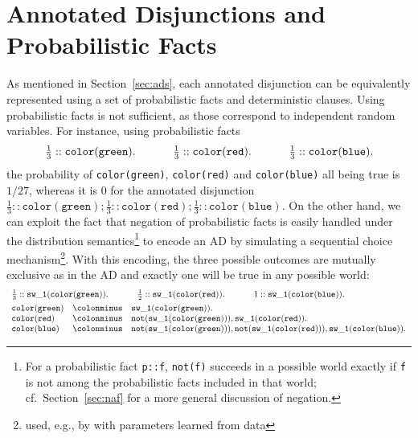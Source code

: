 \documentclass[a4paper]{article}
\begin{document}
\section{Annotated Disjunctions and Probabilistic Facts}
\label{app:adpf} 
As mentioned in Section~\ref{sec:ads}, each annotated disjunction can be equivalently
represented using a set of probabilistic facts and deterministic
clauses.  Using probabilistic facts is not sufficient, as those
correspond to independent random variables. For instance, using
probabilistic facts 
\begin{equation*}
\begin{array}{lllll}
\frac{1}{3} :: \mathtt{color(green)\ldotp} & ~~~~ &
\frac{1}{3} :: \mathtt{color(red)\ldotp} & ~~~~ & 
\frac{1}{3} :: \mathtt{color(blue)\ldotp} 
\end{array}
\end{equation*}
the probability of \verb|color(green)|, \verb|color(red)| and
\verb|color(blue)| all being true is $1/27$, whereas it is $0$ for the
annotated disjunction $\frac{1}{3}::\mathtt{color(green)} ;
\frac{1}{3}::\mathtt{color(red)} ;
\frac{1}{3}::\mathtt{color(blue)}$. 
On the other hand, we can exploit the fact that negation of
probabilistic facts is easily handled under the distribution
semantics\footnote{For a probabilistic fact \texttt{p::f}, \texttt{not(f)}
  succeeds in a possible world exactly if \texttt{f} is not among the
  probabilistic facts included in that world;
  cf.~Section~\ref{sec:naf} for a more general discussion of negation.}
to encode an AD by simulating a
sequential choice mechanism\footnote{used, e.g., by
  \cite{sato:ijcai97} with parameters learned from data}. With this encoding, the three possible outcomes are mutually
exclusive as in the AD and exactly one will be true in any possible
world: 
\begin{alignat*}{2}
&\begin{array}{lllll}
\frac{1}{3} :: \mathtt{sw\_1(color(green))\ldotp} & ~~~~ &
\frac{1}{2} :: \mathtt{sw\_1(color(red))\ldotp} & ~~~~ & 
1 :: \mathtt{sw\_1(color(blue))\ldotp} 
\end{array}\\
&\begin{array}{lll}
\mathtt{color(green)}  & \colonminus & \mathtt{sw\_1(color(green))}\ldotp\\
\mathtt{color(red)}     & \colonminus & \mathtt{not(sw\_1(color(green))),  sw\_1(color(red))}\ldotp\\
\mathtt{color(blue)}    & \colonminus & \mathtt{ not(sw\_1(color(green))),  not(sw\_1(color(red))), sw\_1(color(blue))}\ldotp\\
\end{array}
\end{alignat*}
\end{document}
